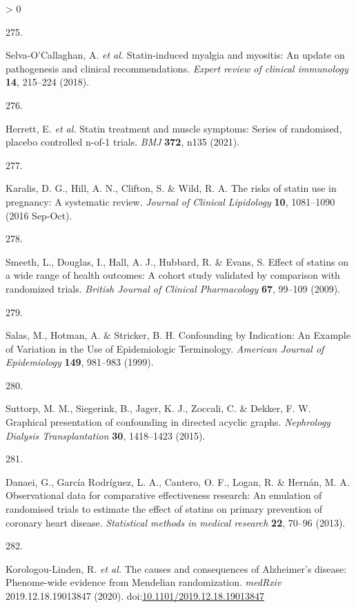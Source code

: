 \documentclass[a4paper, twoside]{templates/ociamthesis}
\newlength{\cslhangindent}
\newlength{\csllabelwidth}
\newenvironment{CSLReferences}[3] %
 {%
  \setlength{\parindent}{0pt}
  \ifodd #1 \everypar{\setlength{\hangindent}{\cslhangindent}}\ignorespaces\fi
  \ifnum #2 > 0
  \setlength{\parskip}{#2\baselineskip}
  \fi
 }%
 {}
\newcommand{\CSLLeftMargin}[1]{\parbox[t]{\maxof{\widthof{#1}}{\csllabelwidth}}{#1}}
\newcommand{\CSLRightInline}[1]{\parbox[t]{\linewidth - \csllabelwidth}{#1}}
\begin{document}
\begin{CSLReferences}{0}{0}
\leavevmode\hypertarget{ref-selva-ocallaghan2018}{}%
\CSLLeftMargin{275. }
\CSLRightInline{Selva-O'Callaghan, A. \emph{et al.} Statin-induced myalgia and myositis: An update on pathogenesis and clinical recommendations. \emph{Expert review of clinical immunology} \textbf{14}, 215--224 (2018).}

\leavevmode\hypertarget{ref-herrett2021}{}%
\CSLLeftMargin{276. }
\CSLRightInline{Herrett, E. \emph{et al.} Statin treatment and muscle symptoms: Series of randomised, placebo controlled n-of-1 trials. \emph{BMJ} \textbf{372}, n135 (2021).}

\leavevmode\hypertarget{ref-karalis2016}{}%
\CSLLeftMargin{277. }
\CSLRightInline{Karalis, D. G., Hill, A. N., Clifton, S. \& Wild, R. A. The risks of statin use in pregnancy: {A} systematic review. \emph{Journal of Clinical Lipidology} \textbf{10}, 1081--1090 (2016 Sep-Oct).}

\leavevmode\hypertarget{ref-smeeth2009}{}%
\CSLLeftMargin{278. }
\CSLRightInline{Smeeth, L., Douglas, I., Hall, A. J., Hubbard, R. \& Evans, S. Effect of statins on a wide range of health outcomes: A cohort study validated by comparison with randomized trials. \emph{British Journal of Clinical Pharmacology} \textbf{67}, 99--109 (2009).}

\leavevmode\hypertarget{ref-salas1999}{}%
\CSLLeftMargin{279. }
\CSLRightInline{Salas, M., Hotman, A. \& Stricker, B. H. Confounding by {Indication}: {An Example} of {Variation} in the {Use} of {Epidemiologic Terminology}. \emph{American Journal of Epidemiology} \textbf{149}, 981--983 (1999).}

\leavevmode\hypertarget{ref-suttorp2015}{}%
\CSLLeftMargin{280. }
\CSLRightInline{Suttorp, M. M., Siegerink, B., Jager, K. J., Zoccali, C. \& Dekker, F. W. Graphical presentation of confounding in directed acyclic graphs. \emph{Nephrology Dialysis Transplantation} \textbf{30}, 1418--1423 (2015).}

\leavevmode\hypertarget{ref-danaei2013b}{}%
\CSLLeftMargin{281. }
\CSLRightInline{Danaei, G., García Rodríguez, L. A., Cantero, O. F., Logan, R. \& Hernán, M. A. Observational data for comparative effectiveness research: An emulation of randomised trials to estimate the effect of statins on primary prevention of coronary heart disease. \emph{Statistical methods in medical research} \textbf{22}, 70--96 (2013).}

\leavevmode\hypertarget{ref-korologou-linden2020}{}%
\CSLLeftMargin{282. }
\CSLRightInline{Korologou-Linden, R. \emph{et al.} The causes and consequences of {Alzheimer}'s disease: Phenome-wide evidence from {Mendelian} randomization. \emph{medRxiv} 2019.12.18.19013847 (2020). doi:\href{https://doi.org/10.1101/2019.12.18.19013847}{10.1101/2019.12.18.19013847}}


\end{CSLReferences}
\end{document}
